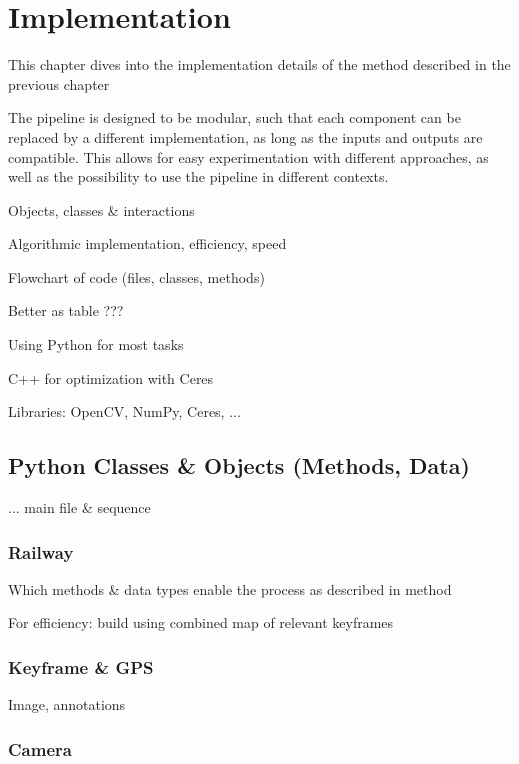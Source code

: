 \chapter{Implementation}
\label{chapter:implementation}

This chapter dives into the implementation details of the method described in the previous chapter



The pipeline is designed to be modular, such that each component can be replaced by a different implementation, as long as the inputs and outputs are compatible. This allows for easy experimentation with different approaches, as well as the possibility to use the pipeline in different contexts.


Objects, classes \& interactions

Algorithmic implementation, efficiency, speed

Flowchart of code (files, classes, methods)


Better as table ???



Using Python for most tasks

C++ for optimization with Ceres

Libraries: OpenCV, NumPy, Ceres, ...

\section{Python Classes \& Objects (Methods, Data)}


... main file \& sequence


\subsection{Railway}

Which methods \& data types enable the process as described in method


For efficiency: build using combined map of relevant keyframes


\subsection{Keyframe \& GPS}


Image, annotations


\subsection{Camera}





